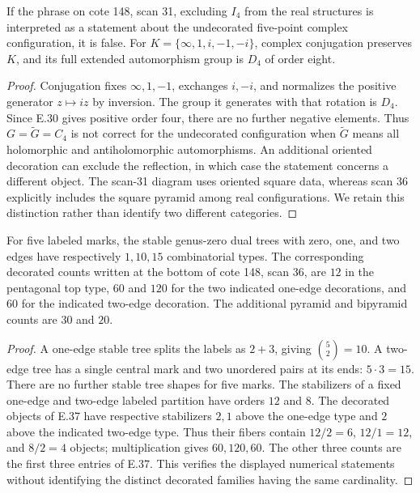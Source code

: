 If the phrase on cote 148, scan 31, excluding $I_4$ from the real
structures is interpreted as a statement about the undecorated
five-point complex configuration, it is false.  For
$K=\{\infty,1,i,-1,-i\}$, complex conjugation preserves $K$,
and its full extended automorphism group is $D_4$ of order eight.
\begin{proof}
Conjugation fixes $\infty,1,-1$, exchanges $i,-i$, and normalizes
the positive generator $z\mapsto iz$ by inversion.  The group
it generates with that rotation is $D_4$.  Since E.30 gives
positive order four, there are no further negative elements.
Thus $G=\widetilde G=C_4$ is not correct for the undecorated
configuration when $\widetilde G$ means all holomorphic and
antiholomorphic automorphisms.  An additional oriented decoration
can exclude the reflection, in which case the statement concerns
a different object.  The scan-31 diagram uses oriented square
data, whereas scan 36 explicitly includes the square pyramid
among real configurations.  We retain this distinction rather
than identify two different categories.
\end{proof}


For five labeled marks, the stable genus-zero dual trees with zero,
one, and two edges have respectively $1,10,15$ combinatorial types.
The corresponding decorated counts written at the bottom of cote 148,
scan 36, are $12$ in the pentagonal top type, $60$ and $120$ for the
two indicated one-edge decorations, and $60$ for the indicated
two-edge decoration.  The additional pyramid and bipyramid counts
are $30$ and $20$.
\begin{proof}
A one-edge stable tree splits the labels as $2+3$, giving
$\binom52=10$.  A two-edge tree has a single central mark and two
unordered pairs at its ends: $5\cdot3=15$.  There are no further
stable tree shapes for five marks.  The stabilizers of a fixed
one-edge and two-edge labeled partition have orders $12$ and $8$.
The decorated objects of E.37 have respective stabilizers $2,1$
above the one-edge type and $2$ above the indicated two-edge type.
Thus their fibers contain $12/2=6$, $12/1=12$, and $8/2=4$
objects; multiplication gives $60,120,60$.  The other three counts
are the first three entries of E.37.  This verifies the displayed
numerical statements without identifying the distinct decorated
families having the same cardinality.
\end{proof}
